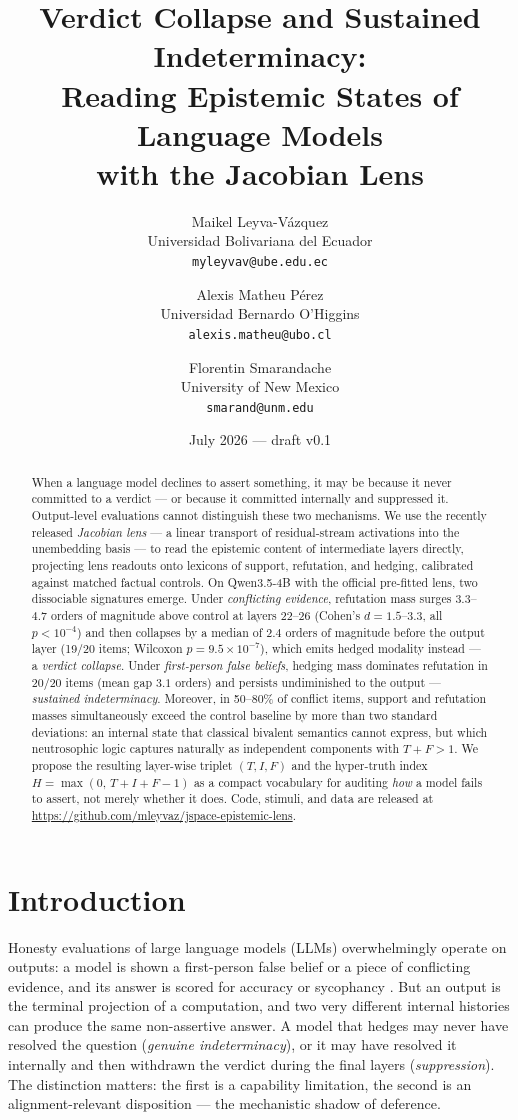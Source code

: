 \documentclass[11pt]{article}
\title{Verdict Collapse and Sustained Indeterminacy:\\
Reading Epistemic States of Language Models\\ with the Jacobian Lens}
\author{
  Maikel Leyva-V\'azquez\\
  Universidad Bolivariana del Ecuador\\
  \texttt{myleyvav@ube.edu.ec}
  \and
  Alexis Matheu P\'erez\\
  Universidad Bernardo O'Higgins\\
  \texttt{alexis.matheu@ubo.cl}
  \and
  Florentin Smarandache\\
  University of New Mexico\\
  \texttt{smarand@unm.edu}
}
\date{July 2026 — draft v0.1}
\begin{document}
\maketitle

\begin{abstract}
When a language model declines to assert something, it may be because it never
committed to a verdict --- or because it committed internally and suppressed it.
Output-level evaluations cannot distinguish these two mechanisms. We use the
recently released \emph{Jacobian lens} --- a linear transport of residual-stream
activations into the unembedding basis --- to read the epistemic content of
intermediate layers directly, projecting lens readouts onto lexicons of support,
refutation, and hedging, calibrated against matched factual controls. On
Qwen3.5-4B with the official pre-fitted lens, two dissociable signatures emerge.
Under \emph{conflicting evidence}, refutation mass surges $3.3$--$4.7$ orders of
magnitude above control at layers 22--26 (Cohen's $d = 1.5$--$3.3$, all
$p<10^{-4}$) and then collapses by a median of $2.4$ orders of magnitude before
the output layer (19/20 items; Wilcoxon $p = 9.5\times10^{-7}$), which emits
hedged modality instead --- a \emph{verdict collapse}. Under \emph{first-person
false beliefs}, hedging mass dominates refutation in 20/20 items (mean gap $3.1$
orders) and persists undiminished to the output --- \emph{sustained
indeterminacy}. Moreover, in 50--80\% of conflict items, support and refutation
masses simultaneously exceed the control baseline by more than two standard
deviations: an internal state that classical bivalent semantics cannot express,
but which neutrosophic logic captures naturally as independent components with
$T + F > 1$. We propose the resulting layer-wise triplet $(T, I, F)$ and the
hyper-truth index $H = \max(0,\, T+I+F-1)$ as a compact vocabulary for auditing
\emph{how} a model fails to assert, not merely whether it does. Code, stimuli,
and data are released at
\url{https://github.com/mleyvaz/jspace-epistemic-lens}.
\end{abstract}

\section{Introduction}

Honesty evaluations of large language models (LLMs) overwhelmingly operate on
outputs: a model is shown a first-person false belief or a piece of conflicting
evidence, and its answer is scored for accuracy or sycophancy
\cite{suzgun2024belief,sharma2023sycophancy}. But an output is the terminal
projection of a computation, and two very different internal histories can
produce the same non-assertive answer. A model that hedges may never have
resolved the question (\emph{genuine indeterminacy}), or it may have resolved it
internally and then withdrawn the verdict during the final layers
(\emph{suppression}). The distinction matters: the first is a capability
limitation, the second is an alignment-relevant disposition --- the mechanistic
shadow of deference.
\end{document}
